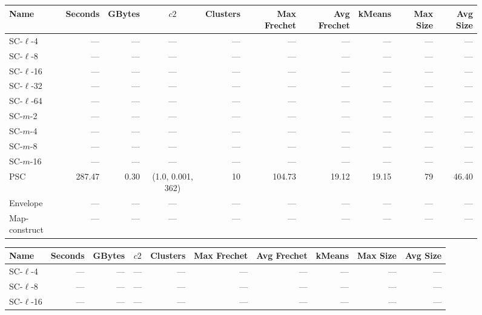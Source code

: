 \clearpage
\newpage 
%
\clearpage
%
    \begin{figure} \begin{center}
        \begin{minipage}{\textwidth}
    {
    \begin{tabular}{@{}lrrcrrrrrr@{}}
        \toprule
        Name & Seconds & GBytes & $c2$ & Clusters & Max Frechet & Avg Frechet & kMeans & Max Size & Avg Size\\
        \midrule
        SC-$\ell$-4 & --- & --- & --- & --- & --- & --- & --- & --- & ---\\
SC-$\ell$-8 & --- & --- & --- & --- & --- & --- & --- & --- & ---\\
SC-$\ell$-16 & --- & --- & --- & --- & --- & --- & --- & --- & ---\\
SC-$\ell$-32& --- & --- & --- & --- & --- & --- & --- & --- & ---\\
SC-$\ell$-64 & --- & --- & --- & --- & --- & --- & --- & --- & ---\\
SC-$m$-2 & --- & --- & --- & --- & --- & --- & --- & --- & ---\\
SC-$m$-4 & --- & --- & --- & --- & --- & --- & --- & --- & ---\\
SC-$m$-8 & --- & --- & --- & --- & --- & --- & --- & --- & ---\\
SC-$m$-16 & --- & --- & --- & --- & --- & --- & --- & --- & ---\\
PSC & 287.47 & 0.30 & (1.0, 0.001, 362) & 10 & 104.73 & 19.12 & 19.15 & 79 & 46.40\\
Envelope & --- & --- & --- & --- & --- & --- & --- & --- & ---\\
Map-construct & --- & --- & --- & --- & --- & --- & --- & --- & ---\\
        \bottomrule
    \end{tabular}
    }
    {
    \begin{tabular}{@{}lrrcrrrrrr@{}}
        \toprule
        Name & Seconds & GBytes & $c2$ & Clusters & Max Frechet & Avg Frechet & kMeans & Max Size & Avg Size\\
        \midrule
        SC-$\ell$-4 & --- & --- & --- & --- & --- & --- & --- & --- & ---\\
SC-$\ell$-8 & --- & --- & --- & --- & --- & --- & --- & --- & ---\\
SC-$\ell$-16 & --- & --- & --- & --- & --- & --- & --- & --- & ---\\

\end{tabular}}
\end{minipage}
\end{center}
\end{figure}
